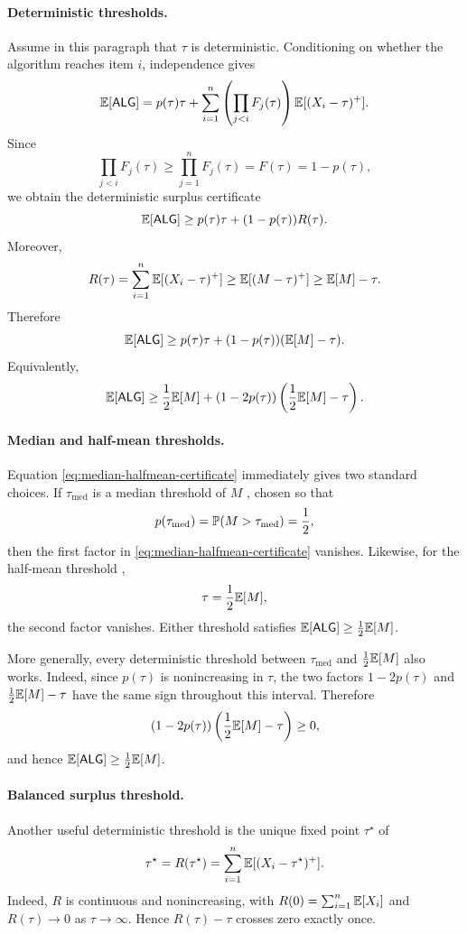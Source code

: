 \paragraph{Deterministic thresholds.}
Assume in this paragraph that $\tau$ is deterministic. Conditioning on whether the algorithm reaches item $i$, independence gives
\[
\mathbb{E}[\mathsf{ALG}]
=
p(\tau)\tau+
\sum_{i=1}^n
\left(\prod_{j<i}F_j(\tau)\right)
\mathbb{E}[(X_i-\tau)^+].
\]
Since
\[
\prod_{j<i}F_j(\tau)
\ge
\prod_{j=1}^n F_j(\tau)
=
F(\tau)
=
1-p(\tau),
\]
we obtain the deterministic surplus certificate
\begin{equation}
\mathbb{E}[\mathsf{ALG}]
\ge
p(\tau)\tau+(1-p(\tau))R(\tau).
\label{eq:det-certificate}
\end{equation}
Moreover,
\[
R(\tau)
=
\sum_{i=1}^n\mathbb{E}[(X_i-\tau)^+]
\ge
\mathbb{E}[(M-\tau)^+]
\ge
\mathbb{E}[M]-\tau.
\]
Therefore
\[
\mathbb{E}[\mathsf{ALG}]
\ge
p(\tau)\tau+(1-p(\tau))(\mathbb{E}[M]-\tau).
\]
Equivalently,
\begin{equation}
\mathbb{E}[\mathsf{ALG}]
\ge
\frac12\mathbb{E}[M]
+
(1-2p(\tau))\left(\frac12\mathbb{E}[M]-\tau\right).
\label{eq:median-halfmean-certificate}
\end{equation}

\paragraph{Median and half-mean thresholds.}
Equation \eqref{eq:median-halfmean-certificate} immediately gives two standard choices. If $\tau_{\mathrm{med}}$ is a median threshold of $M$ \cite{samuelcahn1984threshold}, chosen so that
\[
p(\tau_{\mathrm{med}})
=
\mathbb{P}(M>\tau_{\mathrm{med}})
=
\frac12,
\]
then the first factor in \eqref{eq:median-halfmean-certificate} vanishes. Likewise, for the half-mean threshold \cite{wittmann1995prophet,kleinbergweinberg2012matroid},
\[
\tau=\frac12\mathbb{E}[M],
\]
the second factor vanishes. Either threshold satisfies $\mathbb{E}[\mathsf{ALG}]\ge \frac12\mathbb{E}[M]$.

More generally, every deterministic threshold between $\tau_{\mathrm{med}}$ and $\frac12\mathbb{E}[M]$ also works. Indeed, since $p(\tau)$ is nonincreasing in $\tau$, the two factors $1-2p(\tau)$ and $\frac12\mathbb{E}[M]-\tau$ have the same sign throughout this interval. Therefore
\[
(1-2p(\tau))\left(\frac12\mathbb{E}[M]-\tau\right)\ge 0,
\]
and hence $\mathbb{E}[\mathsf{ALG}]\ge \frac12\mathbb{E}[M]$.

\paragraph{Balanced surplus threshold.}
Another useful deterministic threshold is the unique fixed point $\tau^\star$ of
\[
\tau^\star
=
R(\tau^\star)
=
\sum_{i=1}^n \mathbb{E}[(X_i-\tau^\star)^+].
\]
Indeed, $R$ is continuous and nonincreasing, with $R(0)=\sum_{i=1}^n \mathbb{E}[X_i]$ and $R(\tau)\to 0$ as $\tau\to\infty$. Hence $R(\tau)-\tau$ crosses zero exactly once.


